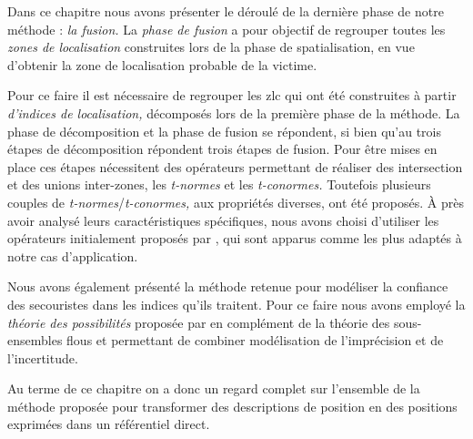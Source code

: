 Dans ce chapitre nous avons présenter le déroulé de la dernière phase
de notre méthode : \emph{la fusion.} La \emph{phase de fusion} a pour
objectif de regrouper toutes les \emph{zones de localisation}
construites lors de la phase de spatialisation, en vue d'obtenir la
zone de localisation probable de la victime.

Pour ce faire il est nécessaire de regrouper les \ac{zlc} qui ont été
construites à partir \emph{d'indices de localisation,} décomposés lors
de la première phase de la méthode. La phase de décomposition et la
phase de fusion se répondent, si bien qu'au trois étapes de
décomposition répondent trois étapes de fusion. Pour être mises en
place ces étapes nécessitent des opérateurs permettant de réaliser des
intersection et des unions inter-zones, les \emph{t-normes} et les
\emph{t-conormes.} Toutefois plusieurs couples de
\emph{t-normes}/\emph{t-conormes,} aux propriétés diverses, ont été
proposés. À près avoir analysé leurs caractéristiques spécifiques,
nous avons choisi d'utiliser les opérateurs initialement proposés par
\textcite{Zadeh1965}, qui sont apparus comme les plus adaptés à notre
cas d’application.

Nous avons également présenté la méthode retenue pour modéliser la
confiance des secouristes dans les indices qu'ils traitent. Pour ce
faire nous avons employé la \emph{théorie des possibilités} proposée
par \textcite{Zadeh1978} en complément de la théorie des
sous-ensembles flous et permettant de combiner modélisation de
l’imprécision et de l'incertitude.

Au terme de ce chapitre on a donc un regard complet sur l'ensemble de
la méthode proposée pour transformer des descriptions de position en
des positions exprimées dans un référentiel direct.


